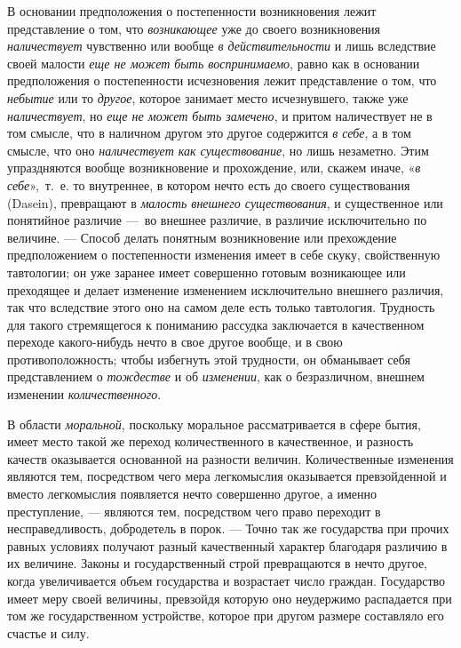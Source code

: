 В основании предположения о постепенности возникновения лежит представление
о том, что {\em возникающее} уже до своего
возникновения {\em наличествует} чувственно или вообще
{\em в действительности} и лишь вследствие своей
малости {\em еще не может быть воспринимаемо}, равно
как в основании предположения о постепенности исчезновения лежит
представление о том, что {\em небытие} или то
{\em другое}, которое занимает место исчезнувшего,
также уже {\em наличествует}, но
{\em еще не может быть замечено}, и притом наличествует
не в том смысле, что в наличном другом это другое содержится
{\em в себе}, а в том смысле, что оно
{\em наличествует как существование}, но лишь
незаметно. Этим упраздняются вообще возникновение и прохождение, или,
скажем иначе, «{\em в себе}»,~т.~е. то внутреннее, в
котором нечто есть до своего существования (Dasein), превращают в
{\em малость внешнего существования}, и существенное
или понятийное различие —~во внешнее различие, в различие исключительно по
величине. — Способ делать понятным возникновение или прехождение
предположением о постепенности изменения имеет в себе скуку, свойственную
тавтологии; он уже заранее имеет совершенно готовым возникающее или
преходящее и делает изменение изменением исключительно внешнего различия,
так что вследствие этого оно на самом деле есть только тавтология.
Трудность для такого стремящегося к пониманию рассудка заключается в
качественном переходе какого-нибудь нечто в свое другое вообще, и в свою
противоположность; чтобы избегнуть этой трудности, он обманывает себя
представлением о {\em тождестве} и об
{\em изменении}, как о безразличном, внешнем изменении
{\em количественного}.

В области {\em моральной}, поскольку моральное
рассматривается в сфере бытия, имеет место такой же переход количественного
в качественное, и разность качеств оказывается основанной на разности
величин. Количественные изменения являются тем, посредством чего мера
легкомыслия оказывается превзойденной и вместо легкомыслия появляется нечто
совершенно другое, а именно преступление, — являются тем, посредством чего
право переходит в несправедливость, добродетель в порок. — Точно так же
государства при прочих равных условиях получают разный качественный
характер благодаря различию в их величине. Законы и государственный строй
превращаются в нечто другое, когда увеличивается объем государства и
возрастает число граждан. Государство имеет меру своей величины, превзойдя
которую оно неудержимо распадается при том же государственном устройстве,
которое при другом размере составляло его счастье и силу.

